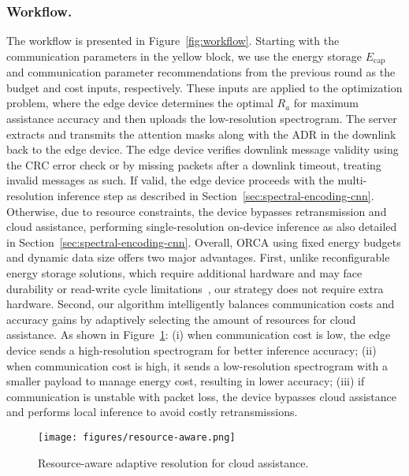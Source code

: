 \subsubsection{Workflow.}
The workflow is presented in Figure~\ref{fig:workflow}. Starting with the communication parameters in the yellow block, we use the energy storage $E_{\text{cap}}$ and communication parameter recommendations from the previous round as the budget and cost inputs, respectively. These inputs are applied to the optimization problem, where the edge device determines the optimal $R_a$ for maximum assistance accuracy and then uploads the low-resolution spectrogram. The server extracts and transmits the attention masks along with the ADR in the downlink back to the edge device. The edge device verifies downlink message validity using the CRC error check or by missing packets after a downlink timeout, treating invalid messages as such. If valid, the edge device proceeds with the multi-resolution inference step as described in Section~\ref{sec:spectral-encoding-cnn}. Otherwise, due to resource constraints, the device bypasses retransmission and cloud assistance, performing single-resolution on-device inference as also detailed in Section~\ref{sec:spectral-encoding-cnn}. Overall, ORCA using fixed energy budgets and dynamic data size offers two major advantages. First, unlike reconfigurable energy storage solutions, which require additional hardware and may face durability or read-write cycle limitations~\cite{colin2018reconfigurable, bakar2022protean, mileiko2023run}, our strategy does not require extra hardware. Second, our algorithm intelligently balances communication costs and accuracy gains by adaptively selecting the amount of resources for cloud assistance. As shown in Figure~\ref{fig:resource-aware}: (i) when communication cost is low, the edge device sends a high-resolution spectrogram for better inference accuracy; (ii) when communication cost is high, it sends a low-resolution spectrogram with a smaller payload to manage energy cost, resulting in lower accuracy; (iii) if communication is unstable with packet loss, the device bypasses cloud assistance and performs local inference to avoid costly retransmissions.


\begin{figure}[tp]
    \centering
    \texttt{[image: figures/resource-aware.png]}
    \vspace{-0.5cm}
    \caption{Resource-aware adaptive resolution for cloud assistance.}
    \label{fig:resource-aware}
    \vspace{-0.2cm}
\end{figure}


